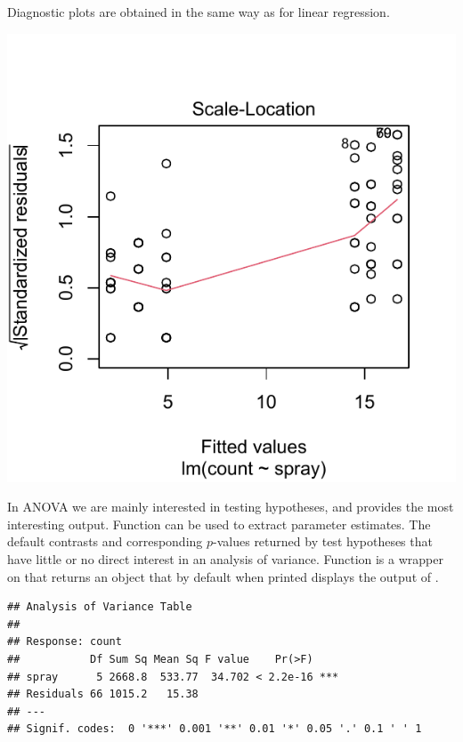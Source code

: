 \documentclass[krantz2]{krantz}\usepackage{knitr}
\begin{document}
Diagnostic plots are obtained in the same way as for linear regression.

\begin{knitrout}\footnotesize
{}\color{fgcolor}\begin{kframe}
\begin{alltt}
  \hlstd{=} \hlstd{)}
\end{alltt}
\end{kframe}

{\centering \includegraphics[width=.54\textwidth]{figure/pos-model-6a-1} 

}


\end{knitrout}

In ANOVA we are mainly interested in testing hypotheses, and  provides the most interesting output. Function  can be used to extract parameter estimates. The default contrasts and corresponding $p$-values returned by  test hypotheses that have little or no direct interest in an analysis of variance. Function  is a wrapper on  that returns an object that by default when printed displays the output of .

\begin{knitrout}\footnotesize
{}\color{fgcolor}\begin{kframe}
\begin{alltt}
\end{alltt}
\begin{verbatim}
## Analysis of Variance Table
## 
## Response: count
##           Df Sum Sq Mean Sq F value    Pr(>F)    
## spray      5 2668.8  533.77  34.702 < 2.2e-16 ***
## Residuals 66 1015.2   15.38                      
## ---
## Signif. codes:  0 '***' 0.001 '**' 0.01 '*' 0.05 '.' 0.1 ' ' 1
\end{verbatim}
\end{kframe}
\end{knitrout}
\end{document}
